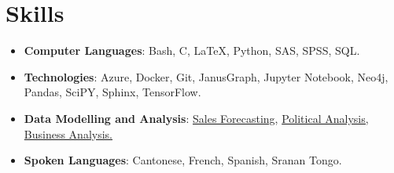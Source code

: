 \documentclass[letterpaper,11pt]{article}
\newcommand{\resumeItem}[2]{
  \item\small{
    \textbf{#1}{: #2 \vspace{-2pt}}
  }
}
\newcommand{\resumeSubItem}[2]{\resumeItem{#1}{#2}\vspace{-4pt}}
\newcommand{\resumeSubHeadingListStart}{\begin{itemize}[leftmargin=*]}
\newcommand{\resumeSubHeadingListEnd}{\end{itemize}}
\begin{document}
\section{Skills}
  \resumeSubHeadingListStart
    \resumeSubItem{Computer Languages}
      {Bash, C, LaTeX, Python, SAS, SPSS, SQL.}
    \resumeSubItem{Technologies}
      {Azure, Docker, Git, JanusGraph, Jupyter Notebook, Neo4j, Pandas, SciPY, Sphinx, TensorFlow.}
    \resumeSubItem{Data Modelling and Analysis}
      {\href{https://docs.jnapolitano.io/parts/analysis/business-analysis/project-retail-sales-forecasting/code-base/SalesForcasting.html}{Sales Forecasting,} {\href{https://docs.jnapolitano.io/parts/analysis/political-analysis/index.html}{Political Analysis,}} {\href{https://docs.jnapolitano.io/parts/analysis/business-analysis/index.html}{Business Analysis.}}}
    \resumeSubItem{Spoken Languages}
      {Cantonese, French, Spanish, Sranan Tongo.}
  \resumeSubHeadingListEnd


\end{document}

